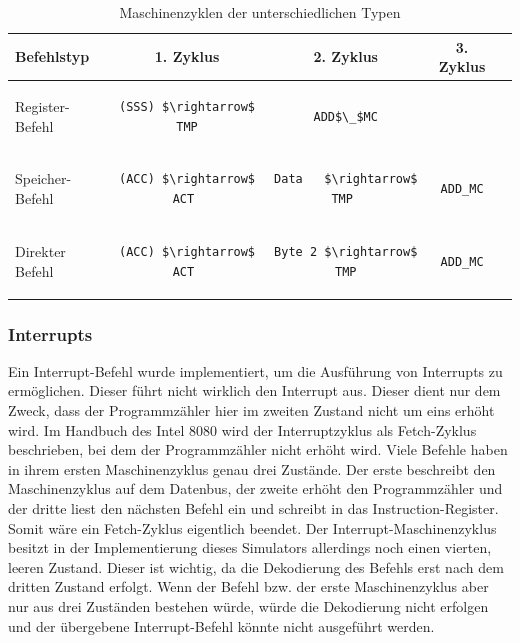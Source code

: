 \documentclass[12pt]{article}
\newcommand{\imgSpaceBefore}{\vspace{10pt}}
\begin{document}
\imgSpaceBefore
\begin{table}[H]
\centering
\begin{tabular}{|l|c|c|c|c| } 
 \hline
 Befehlstyp & 1. Zyklus & 2. Zyklus & 3. Zyklus \\
 \hline 
 Register-Befehl
 &
 \begin{lstlisting}
(SSS) $\rightarrow$ TMP
 \end{lstlisting}
 &
 \begin{lstlisting}
ADD$\_$MC
 \end{lstlisting}
 & \\
 
 Speicher-Befehl & 
 \begin{lstlisting}
(ACC) $\rightarrow$ ACT 
 \end{lstlisting}  
  & 
 \begin{lstlisting}
Data   $\rightarrow$ TMP 
 \end{lstlisting} 
 & 
 \begin{lstlisting}
ADD_MC
 \end{lstlisting} 
 \\ 
 
 Direkter Befehl & 
 \begin{lstlisting}
(ACC) $\rightarrow$ ACT 
 \end{lstlisting} 
 & 
 \begin{lstlisting}
Byte 2 $\rightarrow$ TMP
 \end{lstlisting} 
 &
  \begin{lstlisting}
ADD_MC
 \end{lstlisting}
 \\
 
 \hline
\end{tabular}
\caption{Maschinenzyklen der unterschiedlichen Typen}
\label{table:mc_types}
\end{table}

\subsubsection{Interrupts}
Ein Interrupt-Befehl wurde implementiert, um die Ausführung von Interrupts zu ermöglichen. Dieser führt nicht wirklich den Interrupt aus. Dieser dient nur dem Zweck, dass der Programmzähler hier im zweiten Zustand nicht um eins erhöht wird. Im Handbuch des Intel 8080 \cite{IntMan16} wird der Interruptzyklus als Fetch-Zyklus beschrieben, bei dem der Programmzähler nicht erhöht wird. Viele Befehle haben in ihrem ersten Maschinenzyklus genau drei Zustände. Der erste beschreibt den Maschinenzyklus auf dem Datenbus, der zweite erhöht den Programmzähler und der dritte liest den nächsten Befehl ein und schreibt in das Instruction-Register. Somit wäre ein Fetch-Zyklus eigentlich beendet. Der Interrupt-Maschinenzyklus besitzt in der Implementierung dieses Simulators allerdings noch einen vierten, leeren Zustand. Dieser ist wichtig, da die Dekodierung des Befehls erst nach dem dritten Zustand erfolgt. Wenn der Befehl bzw. der erste Maschinenzyklus aber nur aus drei Zuständen bestehen würde, würde die Dekodierung nicht erfolgen und der übergebene Interrupt-Befehl könnte nicht ausgeführt werden.
\end{document}
